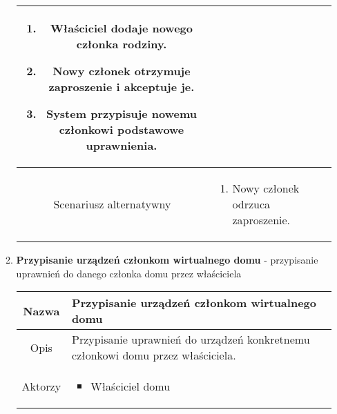 \documentclass{article}
\begin{document}
\begin{enumerate}
\begin{enumerate}
\begin{table}[H]
\begin{tabular}{|c|p{7cm}|}
\begin{enumerate}
\item Właściciel dodaje nowego członka rodziny.

\item Nowy członek otrzymuje zaproszenie i akceptuje je.

\item System przypisuje nowemu członkowi podstawowe uprawnienia.\end{enumerate} \\
						\hline
						Scenariusz alternatywny & \begin{enumerate}\item Nowy członek odrzuca zaproszenie.\end{enumerate}                                                                                                                                                                                           \\
						\hline
					\end{tabular}
				\end{table}

			\item \textbf{Przypisanie urządzeń członkom wirtualnego domu} -
				przypisanie uprawnień do danego członka domu przez właściciela
				\begin{table}[H]
					\centering
					\begin{tabular}{|c|p{7cm}|}
						\hline
						Nazwa                   & \textbf{Przypisanie urządzeń członkom wirtualnego domu}                                                                                                                                                                 \\
						\hline
						Opis                    & Przypisanie uprawnień do urządzeń konkretnemu członkowi domu przez właściciela.                                                                                                                                         \\
						\hline
						Aktorzy                 & \begin{itemize}\item Właściciel domu


\end{itemize}
\end{tabular}
\end{table}
\end{enumerate}
\end{enumerate}
\end{document}

